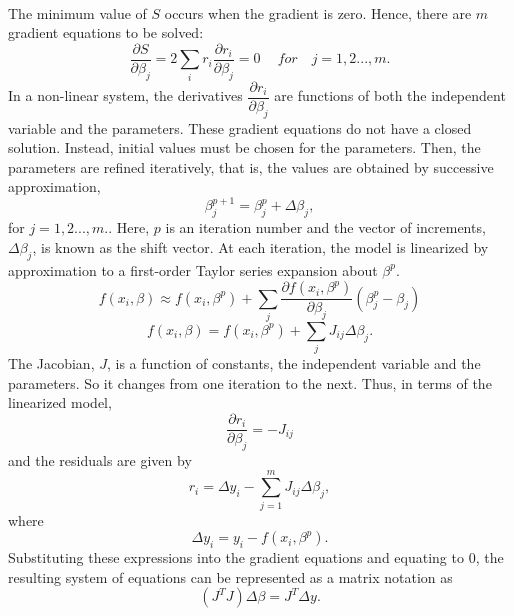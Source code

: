 \documentclass[a4paper,10pt]{report}
\begin{document}
\paragraph*{}
The minimum value of $S$ occurs when the gradient is zero. Hence, there are $m$ gradient equations to be solved:
\begin{equation}
    \dfrac{\partial S}{\partial \beta_j}=2\sum_i r_i\dfrac{\partial r_i}{\partial \beta_j}=0 \ \quad for \quad j=1,2...,m.
\end{equation}
In a non-linear system, the derivatives $\dfrac{\partial r_i}{\partial \beta_j}$ are functions of both the independent variable and the parameters. These gradient equations do not have a closed solution. Instead, initial values must be chosen for the
parameters. Then, the parameters are refined iteratively, that is, the values are obtained by successive approximation,
\begin{equation}
    \beta_j^{p+1}=\beta^p_j+\Delta \beta_j,
\end{equation}
for $j=1,2...,m.$. Here, $p$ is an iteration number and the vector of increments, $\Delta \beta_j$, is known as the shift vector. At each iteration, the model is linearized by approximation to a first-order Taylor series expansion about $\beta^p$.
\begin{equation}
    f(x_i,\beta)\approx f(x_i,\beta^p) +\sum_j \dfrac{\partial f(x_i, \beta^p)}{\partial \beta_j} \left(\beta^p_j -\beta_j \right)
\end{equation}
\begin{equation}
 f(x_i,\beta) =f(x_i, \beta^p)+\sum_j J_{ij} \Delta\beta_j.
\end{equation}
The Jacobian, $J$, is a function of constants, the independent variable and the parameters. So it changes from one iteration to the
next. Thus, in terms of the linearized model,
\begin{equation}
\dfrac{\partial r_i}{\partial \beta_j}=-J_{ij}
\end{equation}
and the residuals are given by
\begin{equation}
    r_i=\Delta y_i- \sum_{j=1}^{m} J_{ij}\Delta\beta_j,
\end{equation}
where
\begin{equation}
 \Delta y_i=y_i- f(x_i, \beta^p).
\end{equation}
Substituting these expressions into the gradient equations and equating to $0$, the resulting system of equations can be represented as a matrix notation as
\begin{equation}
    \left(J^TJ\right)\Delta  \beta=J^T\Delta y.
\end{equation}
\end{document}
